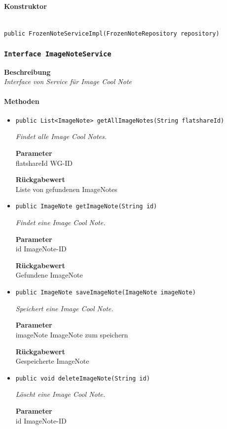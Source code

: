      \paragraph*{Konstruktor}\mbox{} \\
     \texttt{public FrozenNoteServiceImpl(FrozenNoteRepository repository)} \\
     \subsubsection{\texttt{Interface ImageNoteService}}
     \textbf{Beschreibung} \\
     \textit{Interface von Service für Image Cool Note}
     \paragraph*{Methoden}
     \begin{itemize}
     	\item{\texttt{public List<ImageNote> getAllImageNotes(String flatshareId)}}
     	
     	\textit{Findet alle Image Cool Notes.}
     	
     	\textbf{Parameter} \\
     	flatshareId WG-ID
     	
     	\textbf{Rückgabewert} \\
     	Liste von gefundenen ImageNotes        \item{\texttt{public ImageNote getImageNote(String id)}}
     	
     	\textit{Findet eine Image Cool Note.}
     	
     	\textbf{Parameter} \\
     	id ImageNote-ID
     	
     	\textbf{Rückgabewert} \\
     	Gefundene ImageNote        \item{\texttt{public ImageNote saveImageNote(ImageNote imageNote)}}
     	
     	\textit{Speichert eine Image Cool Note.}
     	
     	\textbf{Parameter} \\
     	imageNote ImageNote zum speichern
     	
     	\textbf{Rückgabewert} \\
     	Gespeicherte ImageNote        \item{\texttt{public void deleteImageNote(String id)}}
     	
     	\textit{Löscht eine Image Cool Note.}
     	
     	\textbf{Parameter} \\
     	id ImageNote-ID
     	
     	
     \end{itemize}
